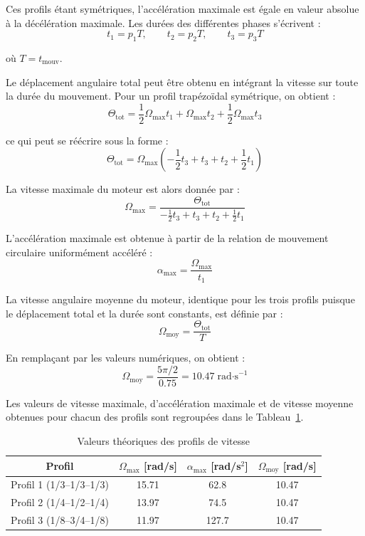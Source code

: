 Ces profils étant symétriques, l’accélération maximale est égale en valeur absolue à la décélération maximale. Les durées des différentes phases s’écrivent :
\begin{equation}
t_1 = p_1 T, \qquad
t_2 = p_2 T, \qquad
t_3 = p_3 T
\end{equation}

où $T = t_{\text{mouv}}$.

Le déplacement angulaire total peut être obtenu en intégrant la vitesse sur toute la durée du mouvement. Pour un profil trapézoïdal symétrique, on obtient :
\begin{equation}
\Theta_{\text{tot}} =
\frac{1}{2}\Omega_{\max} t_1
+ \Omega_{\max} t_2
+ \frac{1}{2}\Omega_{\max} t_3
\end{equation}

ce qui peut se réécrire sous la forme :
\begin{equation}
\Theta_{\text{tot}} =
\Omega_{\max}
\left(
-\frac{1}{2}t_3 + t_3 + t_2 + \frac{1}{2}t_1
\right)
\end{equation}

La vitesse maximale du moteur est alors donnée par :
\begin{equation}
\Omega_{\max} =
\frac{\Theta_{\text{tot}}}
{
-\frac{1}{2}t_3 + t_3 + t_2 + \frac{1}{2}t_1
}
\end{equation}

L’accélération maximale est obtenue à partir de la relation de mouvement circulaire uniformément accéléré :
\begin{equation}
\alpha_{\max} = \frac{\Omega_{\max}}{t_1}
\end{equation}

La vitesse angulaire moyenne du moteur, identique pour les trois profils puisque le déplacement total et la durée sont constants, est définie par :
\begin{equation}
\Omega_{\text{moy}} = \frac{\Theta_{\text{tot}}}{T}
\end{equation}

En remplaçant par les valeurs numériques, on obtient :
\begin{equation}
\Omega_{\text{moy}} =
\frac{5\pi/2}{0.75}
= 10.47 \; \text{rad·s}^{-1}
\end{equation}

Les valeurs de vitesse maximale, d’accélération maximale et de vitesse moyenne obtenues pour chacun des profils sont regroupées dans le Tableau~\ref{tab:valeurs_profils}.

\begin{table}[h]
\centering
\begin{tabular}{|c|c|c|c|}
\hline
Profil & $\Omega_{\max}$ [rad/s] & $\alpha_{\max}$ [rad/s$^2$] & $\Omega_{\text{moy}}$ [rad/s] \\
\hline
Profil 1 (1/3--1/3--1/3) & 15.71 & 62.8 & 10.47 \\
Profil 2 (1/4--1/2--1/4) & 13.97 & 74.5 & 10.47 \\
Profil 3 (1/8--3/4--1/8) & 11.97 & 127.7 & 10.47 \\
\hline
\end{tabular}
\caption{Valeurs théoriques des profils de vitesse}
\label{tab:valeurs_profils}
\end{table}


